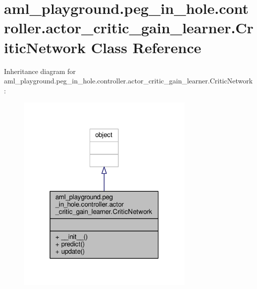 \hypertarget{classaml__playground_1_1peg__in__hole_1_1controller_1_1actor__critic__gain__learner_1_1_critic_network}{\section{aml\-\_\-playground.\-peg\-\_\-in\-\_\-hole.\-controller.\-actor\-\_\-critic\-\_\-gain\-\_\-learner.\-Critic\-Network Class Reference}
\label{classaml__playground_1_1peg__in__hole_1_1controller_1_1actor__critic__gain__learner_1_1_critic_network}
}


Inheritance diagram for aml\-\_\-playground.\-peg\-\_\-in\-\_\-hole.\-controller.\-actor\-\_\-critic\-\_\-gain\-\_\-learner.\-Critic\-Network\-:\nopagebreak
\begin{figure}[H]
\begin{center}
\leavevmode
\includegraphics[width=244pt]{classaml__playground_1_1peg__in__hole_1_1controller_1_1actor__critic__gain__learner_1_1_critic_network__inherit__graph}
\end{center}
\end{figure}


